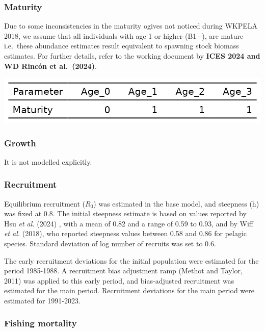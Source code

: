 \documentclass[
]{article}
\begin{document}
\hypertarget{maturity}{%
\subsubsection{Maturity}\label{maturity}}

Due to some inconsistencies in the maturity ogives not noticed during
WKPELA 2018, we assume that all individuals with age 1 or higher (B1+),
are mature i.e.~these abundance estimates result equivalent to spawning
stock biomass estimates. For further details, refer to the working
document by \textbf{ICES 2024 and WD Rincón et al.~(2024)}.

\begin{center}\includegraphics[width=0.95\linewidth]{report/run/S1.0_4FLEETS/tb_maturity} \end{center}

\hypertarget{growth}{%
\subsubsection{Growth}\label{growth}}

It is not modelled explicitly.

\hypertarget{recruitment}{%
\subsubsection{Recruitment}\label{recruitment}}

Equilibrium recruitment (\(R_0\)) was estimated in the base model, and
steepness (h) was fixed at 0.8. The initial steepness estimate is based
on values reported by Hsu \emph{et al.} (2024) , with a mean of 0.82 and
a range of 0.59 to 0.93, and by Wiff \emph{et al.} (2018), who reported
steepness values between 0.58 and 0.86 for pelagic species. Standard
deviation of log number of recruits was set to 0.6.

The early recruitment deviations for the initial population were
estimated for the period 1985-1988. A recruitment bias adjustment ramp
(Methot and Taylor, 2011) was applied to this early period, and
bias-adjusted recruitment was estimated for the main period. Recruitment
deviations for the main period were estimated for 1991-2023.

\hypertarget{fishing-mortality}{%
\subsubsection{Fishing mortality}\label{fishing-mortality}}
\end{document}
